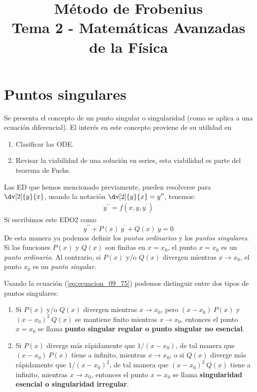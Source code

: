 
\title{Método de Frobenius \\ \large {Tema 2 - Matemáticas Avanzadas de la Física}\vspace{-1.5\baselineskip}}
\date{ }
\author{}

\maketitle
\fontsize{14}{14}\selectfont
\section{Puntos singulares}
Se presenta el concepto de un punto singular o singularidad (como se aplica a una ecuación diferencial). El interés en este concepto proviene de su utilidad en
\begin{enumerate}
\item Clasificar las ODE.
\item Revisar la viabilidad de una solución en series, esta viabilidad es parte del teorema de Fuchs.
\end{enumerate}
\par
Las ED que hemos mencionado previamente, pueden resolverse para $\displaystyle \dv[2]{y}{x}$, usando la notación $\displaystyle \dv[2]{y}{x} = y^{\prime \prime}$, tenemos:
\begin{align}
y^{\prime \prime} = f(x, y, y^{\prime})
\label{eq:ecuacion_09_74}
\end{align}
Si escribimos este EDO2 como
\begin{equation}
y^{\prime \prime} + P(x) \: y^{\prime} + Q(x) \: y = 0
\label{eq:ecuacion_09_75}
\end{equation}
De esta manera ya podemos definir los \emph{puntos ordinarios} y los \emph{puntos singulares}. Si las funciones $P(x)$ y $Q(x)$ son finitas en $x = x_{0}$, el punto $x = x_{0}$ es un \emph{punto ordinario}. Al 
contrario, si $P(x)$ y/o $Q(x)$ divergen mientras $x \to x_{0}$, el punto $x_{0}$ es un \emph{punto singular}.
\par
Usando la ecuación (\ref{eq:ecuacion_09_75}) podemos distinguir entre dos tipos de puntos singulares:
\begin{enumerate}
\item Si $P(x)$ y/o $Q(x)$ divergen mientras $x \to x_{0}$, pero $(x - x_{0}) \: P(x)$ y $(x - x_{0})^{2} \: Q(x)$ se mantiene finito mientras $x \to x_{0}$, entonces el punto $x = x_{0}$ se llama \textbf{punto singular regular o punto singular no esencial}.
\item Si $P(x)$ diverge más rápidamente que $1/(x - x_{0})$, de tal manera que $(x - x_{0}) \: P(x)$ tiene a infinito, mientras $x \to x_{0}$, o si $Q(x)$ diverge más rápidamente que $1/(x - x_{0})^{2}$, de tal manera que $(x - x_{0})^{2} \: Q(x)$ tiene a infinito, mientras $x \to x_{0}$, entonces el punto $x = x_{0}$ se llama \textbf{singularidad esencial o singularidad irregular}.
\end{enumerate}

